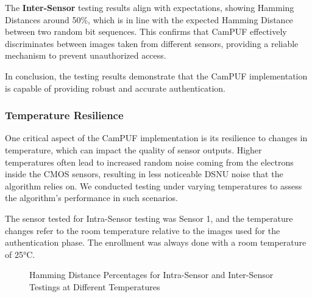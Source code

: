The \textbf{Inter-Sensor} testing results align with expectations, showing Hamming Distances around 50\%, which is in line with the expected Hamming Distance between two random bit sequences. This confirms that CamPUF effectively discriminates between images taken from different sensors, providing a reliable mechanism to prevent unauthorized access.

In conclusion, the testing results demonstrate that the CamPUF implementation is capable of providing robust and accurate authentication.

\subsubsection{Temperature Resilience}

One critical aspect of the CamPUF implementation is its resilience to changes in temperature, which can impact the quality of sensor outputs. Higher temperatures often lead to increased random noise coming from the electrons inside the CMOS sensors, resulting in less noticeable DSNU noise that the algorithm relies on. We conducted testing under varying temperatures to assess the algorithm's performance in such scenarios.

The sensor tested for Intra-Sensor testing was Sensor 1, and the temperature changes refer to the room temperature relative to the images used for the authentication phase. The enrollment was always done with a room temperature of 25°C.

\begin{figure}[h!]
	\centering
	\caption{Hamming Distance Percentages for Intra-Sensor and Inter-Sensor Testings at Different Temperatures}
	\label{fig:temperature_graph}
\end{figure}

